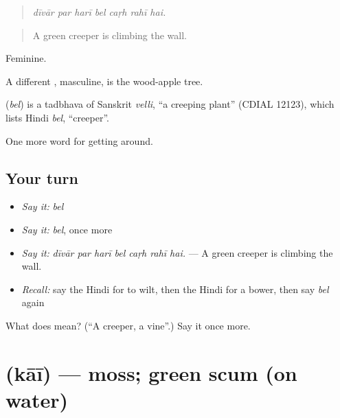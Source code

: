 \begin{quote}
      
\end{quote}

\begin{quote}
\emph{dīvār par harī bel caṛh rahī hai.}
\end{quote}

\begin{quote}
A green creeper is climbing the wall.
\end{quote}

Feminine.

A different , masculine, is the wood-apple tree.

\begin{cousinweb}
\textbf{} (\emph{bel}) is a tadbhava of Sanskrit \emph{velli}, \textquotedblleft{}a creeping plant\textquotedblright{} (CDIAL 12123), which lists Hindi \emph{bel}, \textquotedblleft{}creeper\textquotedblright{}.
\end{cousinweb}

\begin{grammarlens}[title={What you've built}]
One more word for getting around.
\end{grammarlens}

\subsection*{Your turn}
\begin{itemize}
\raggedright
  \item \emph{Say it:} \emph{bel}
  \item \emph{Say it:} \emph{bel}, once more
  \item \emph{Say it:} \emph{dīvār par harī bel caṛh rahī hai.} — A green creeper is climbing the wall.
  \item \emph{Recall:} say the Hindi for to wilt, then the Hindi for a bower, then say \emph{bel} again
\end{itemize}

\begin{tcolorbox}[breakable,colback=teal!4,colframe=teal!35!black,title={Before you move on}]
What does  mean? (\textquotedblleft{}A creeper, a vine\textquotedblright{}.) Say it once more.
\end{tcolorbox}
\section[\texorpdfstring{\hi{काई} (kāī)}{काई (kāī)}]{ (kāī) — moss; green scum (on water)}

